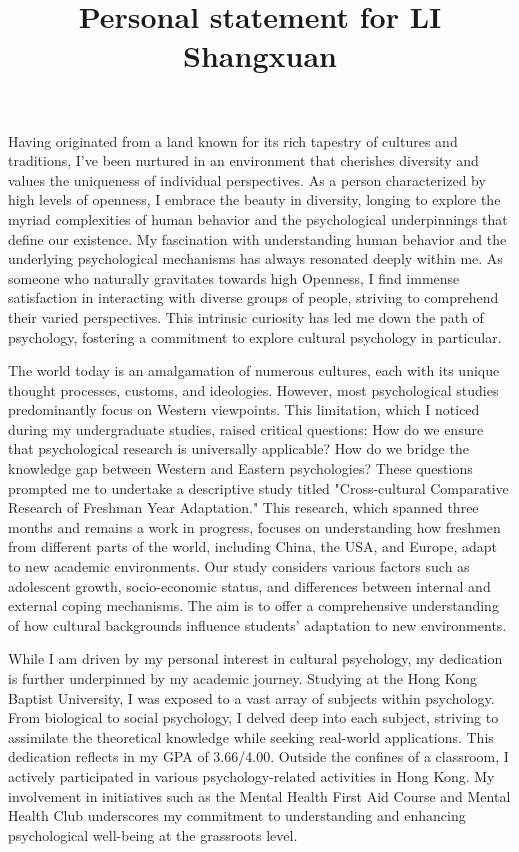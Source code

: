 \documentclass[]{article}
\title{Personal statement for LI Shangxuan}
\begin{document}
\maketitle

Having originated from a land known for its rich tapestry of cultures and traditions, I’ve been nurtured in an environment that cherishes diversity and values the uniqueness of individual perspectives. As a person characterized by high levels of openness, I embrace the beauty in diversity, longing to explore the myriad complexities of human behavior and the psychological underpinnings that define our existence. My fascination with understanding human behavior and the underlying psychological mechanisms has always resonated deeply within me. As someone who naturally gravitates towards high Openness, I find immense satisfaction in interacting with diverse groups of people, striving to comprehend their varied perspectives. This intrinsic curiosity has led me down the path of psychology, fostering a commitment to explore cultural psychology in particular.

The world today is an amalgamation of numerous cultures, each with its unique thought processes, customs, and ideologies. However, most psychological studies predominantly focus on Western viewpoints. This limitation, which I noticed during my undergraduate studies, raised critical questions: How do we ensure that psychological research is universally applicable? How do we bridge the knowledge gap between Western and Eastern psychologies? These questions prompted me to undertake a descriptive study titled "Cross-cultural Comparative Research of Freshman Year Adaptation." This research, which spanned three months and remains a work in progress, focuses on understanding how freshmen from different parts of the world, including China, the USA, and Europe, adapt to new academic environments. Our study considers various factors such as adolescent growth, socio-economic status, and differences between internal and external coping mechanisms. The aim is to offer a comprehensive understanding of how cultural backgrounds influence students' adaptation to new environments.

While I am driven by my personal interest in cultural psychology, my dedication is further underpinned by my academic journey. Studying at the Hong Kong Baptist University, I was exposed to a vast array of subjects within psychology. From biological to social psychology, I delved deep into each subject, striving to assimilate the theoretical knowledge while seeking real-world applications. This dedication reflects in my GPA of 3.66/4.00. Outside the confines of a classroom, I actively participated in various psychology-related activities in Hong Kong. My involvement in initiatives such as the Mental Health First Aid Course and Mental Health Club underscores my commitment to understanding and enhancing psychological well-being at the grassroots level.
\end{document}
